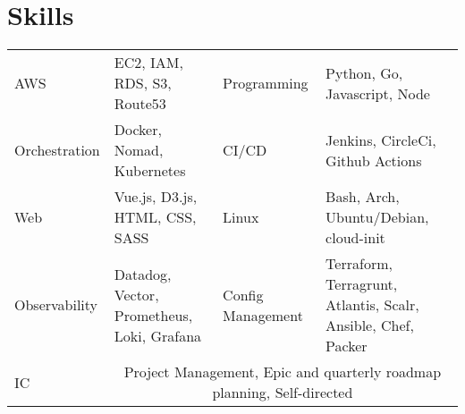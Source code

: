 \section{Skills}
\begin{tabularx}{\linewidth}{ l X | l X }
  AWS & \normalsize{EC2, IAM, RDS, S3, Route53} &
  Programming & \normalsize{Python, Go, Javascript, Node} \\
  Orchestration & \normalsize{Docker, Nomad, Kubernetes} &
  CI/CD & \normalsize{Jenkins, CircleCi, Github Actions} \\
  Web & \normalsize{Vue.js, D3.js, HTML, CSS, SASS} &
  Linux & \normalsize{Bash, Arch, Ubuntu/Debian, cloud-init} \\
  Observability & \normalsize{Datadog, Vector, Prometheus, Loki, Grafana} &
  Config Management & \normalsize{Terraform, Terragrunt, Atlantis, Scalr, Ansible, Chef, Packer} \\
  IC & \multicolumn{3}{c}{\normalsize{Project Management, Epic and quarterly roadmap planning, Self-directed}} \\
\end{tabularx}
